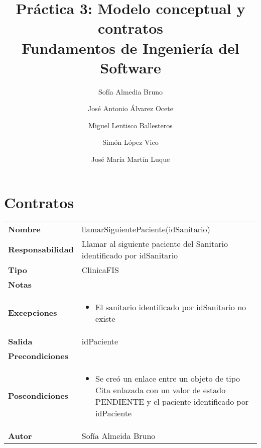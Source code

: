 \documentclass[11pt,a4paper]{article}
\title{Práctica 3: Modelo conceptual y contratos \large\\ Fundamentos de Ingeniería del Software}
\author{Sofía Almedia Bruno \and José Antonio Álvarez Ocete \and Miguel Lentisco Ballesteros \and Simón López Vico \and José María Martín Luque}
\begin{document}
\maketitle

\section{Contratos}

\begin{table}[H]
\centering
\label{my-label}
\begin{tabularx}{\textwidth}{l|X}
\textbf{Nombre}          & llamarSiguientePaciente(idSanitario) \\
\textbf{Responsabilidad} & Llamar al siguiente paciente del Sanitario identificado por idSanitario \\
\textbf{Tipo}            & ClinicaFIS \\
\textbf{Notas}           &  \\
\textbf{Excepciones}     & 
\begin{itemize}
\item El sanitario identificado por idSanitario no existe
\end{itemize}\\
\textbf{Salida}          & idPaciente \\
\textbf{Precondiciones}  &  \\
\textbf{Poscondiciones}  &
\begin{itemize}
\item Se creó un enlace entre un objeto de tipo Cita enlazada con un valor de estado PENDIENTE y el paciente identificado por idPaciente 
\end{itemize}\\
\textbf{Autor} & Sofía Almeida Bruno\\
\end{tabularx}
\end{table}
\end{document}
